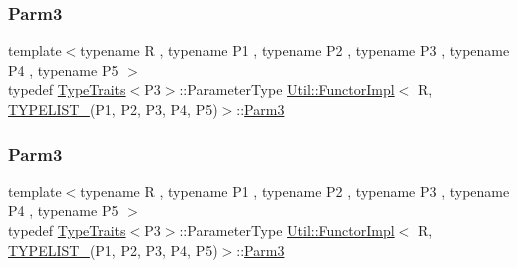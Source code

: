 \mbox{\label{classUtil_1_1FunctorImpl_3_01R_00_01TYPELIST__5_07P1_00_01P2_00_01P3_00_01P4_00_01P5_08_4_a5ad1ce88b66a6e09b4a462f27ebeb665}} 
\subsubsection{\texorpdfstring{Parm3}{Parm3}\hspace{0.1cm}{\footnotesize\ttfamily [1/2]}}
{\footnotesize\ttfamily template$<$typename R , typename P1 , typename P2 , typename P3 , typename P4 , typename P5 $>$ \\
typedef \mbox{\hyperlink{classUtil_1_1TypeTraits}{Type\+Traits}}$<$P3$>$\+::Parameter\+Type \mbox{\hyperlink{classUtil_1_1FunctorImpl}{Util\+::\+Functor\+Impl}}$<$ R, \mbox{\hyperlink{install_2include_2adat_2typelist_8h_aad5d9b3c82c8503c85c625acd41c0a2f}{T\+Y\+P\+E\+L\+I\+S\+T\+\_}}(P1, P2, P3, P4, P5)$>$\+::\mbox{\hyperlink{structUtil_1_1Private_1_1FunctorImplBase_a052148e627fd4caecbcffdbdf1033dbb}{Parm3}}}

\mbox{\label{classUtil_1_1FunctorImpl_3_01R_00_01TYPELIST__5_07P1_00_01P2_00_01P3_00_01P4_00_01P5_08_4_a5ad1ce88b66a6e09b4a462f27ebeb665}} 
\subsubsection{\texorpdfstring{Parm3}{Parm3}\hspace{0.1cm}{\footnotesize\ttfamily [2/2]}}
{\footnotesize\ttfamily template$<$typename R , typename P1 , typename P2 , typename P3 , typename P4 , typename P5 $>$ \\
typedef \mbox{\hyperlink{classUtil_1_1TypeTraits}{Type\+Traits}}$<$P3$>$\+::Parameter\+Type \mbox{\hyperlink{classUtil_1_1FunctorImpl}{Util\+::\+Functor\+Impl}}$<$ R, \mbox{\hyperlink{install_2include_2adat_2typelist_8h_aad5d9b3c82c8503c85c625acd41c0a2f}{T\+Y\+P\+E\+L\+I\+S\+T\+\_}}(P1, P2, P3, P4, P5)$>$\+::\mbox{\hyperlink{structUtil_1_1Private_1_1FunctorImplBase_a052148e627fd4caecbcffdbdf1033dbb}{Parm3}}}

